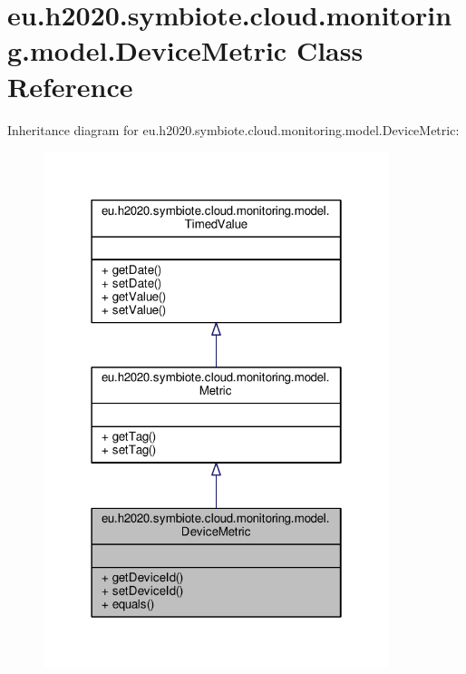 \hypertarget{classeu_1_1h2020_1_1symbiote_1_1cloud_1_1monitoring_1_1model_1_1DeviceMetric}{}\section{eu.\+h2020.\+symbiote.\+cloud.\+monitoring.\+model.\+Device\+Metric Class Reference}
\label{classeu_1_1h2020_1_1symbiote_1_1cloud_1_1monitoring_1_1model_1_1DeviceMetric}


Inheritance diagram for eu.\+h2020.\+symbiote.\+cloud.\+monitoring.\+model.\+Device\+Metric\+:\nopagebreak
\begin{figure}[H]
\begin{center}
\leavevmode
\includegraphics[width=286pt]{classeu_1_1h2020_1_1symbiote_1_1cloud_1_1monitoring_1_1model_1_1DeviceMetric__inherit__graph}
\end{center}
\end{figure}


